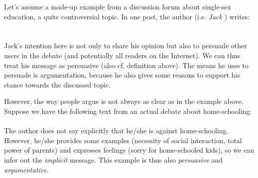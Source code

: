 Let’s assume a made-up example from a discussion forum about single-sex education, a quite
controversial topic. In one post, the author (i.e. \emph{Jack} ) writes:
\\
\\
\\

Jack’s intention here is not only to share his opinion but also to persuade other users in the
debate (and potentially all readers on the Internet). We can thus treat his message as persuasive
(also cf. definition above). The means he uses to persuade is argumentation, because he also gives
some reasons to support his stance towards the discussed topic.

However, the way people argue is not always as clear as in the example above. Suppose we have the following text from an actual debate about home-schooling:
\\
\\

The author does not say explicitly that he/she is against home-schooling. However, he/she
provides some examples (necessity of social interaction, total power of parents) and expresses
feelings (sorry for home-schooled kids), so we can infer out the \emph{implicit} message. This example is
thus also \emph{persuasive} and \emph{argumentative}.
